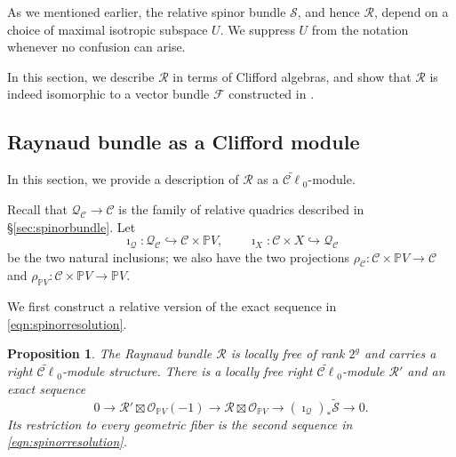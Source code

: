 \documentclass[12pt, letterpaper]{amsart}
\newtheorem{proposition}[theorem]{Proposition}
\theoremstyle{definition}
\newcommand{\PP}{\mathbb{P} }
\newcommand{\cC}{\mathcal{C} }
\newcommand{\cF}{\mathcal{F} }
\newcommand{\cO}{\mathcal{O} }
\newcommand{\cQ}{\mathcal{Q} }
\newcommand{\cR}{\mathcal{R} }
\newcommand{\cS}{\mathcal{S} }
\begin{document}
As we mentioned earlier, the relative spinor bundle \(\cS\), and hence \(\cR\), depend on a choice of maximal isotropic subspace \(U\). We suppress \(U\) from the notation whenever no confusion can arise.

In this section, we describe \(\cR\) in terms of Clifford algebras, and show that \(\cR\) is indeed isomorphic to a vector bundle \(\cF\) constructed in \cite[Proposition~4.5]{ES25}.

\subsection{Raynaud bundle as a Clifford module}

In this section, we provide a description of \(\cR\) as a \(\widetilde{\cC\ell}_0\)-module.

Recall that \(\cQ_{\cC} \to \cC\) is the family of relative quadrics described in \S\ref{sec:spinorbundle}. Let
\[\imath_{\cQ} :\cQ_{\cC} \hookrightarrow \cC \times\PP V,\qquad \imath_X: \cC\times X\hookrightarrow\cQ_{\cC}\]
be the two natural inclusions; we also have the two projections \(\rho_{\cC} : \cC \times \PP V \to \cC\) and \(\rho_{\PP V} : \cC \times \PP V \to \PP V\).

We first construct a relative version of the exact sequence in \eqref{eqn:spinorresolution}.

\begin{proposition}\label{prop:relativeMF}
The Raynaud bundle \(\cR\) is locally free of rank \(2^g\) and carries a right \(\widetilde{\cC\ell}_0\)-module structure. There is a locally free right \(\widetilde{\cC\ell}_0\)-module \(\cR'\) and an exact sequence
\begin{equation}\label{eqn:relative_spinor_ambient_resolution}
0\longrightarrow \cR'\boxtimes\cO_{\PP V}(-1) \longrightarrow \cR\boxtimes\cO_{\PP V} \longrightarrow (\imath_{\cQ})_*\widetilde{\cS} \longrightarrow0.
\end{equation}
Its restriction to every geometric fiber is the second sequence in \eqref{eqn:spinorresolution}.
\end{proposition}
\end{document}
